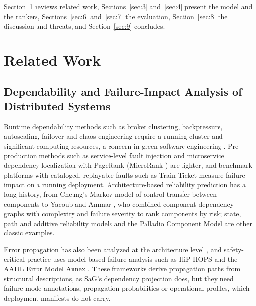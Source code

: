 \documentclass[preprint,3p]{elsarticle}
\begin{document}
Section~\ref{sec:2} reviews related work, Sections~\ref{sec:3} and~\ref{sec:4} present the model and the rankers, Sections~\ref{sec:6} and~\ref{sec:7} the evaluation, Section~\ref{sec:8} the discussion and threats, and Section~\ref{sec:9} concludes.

\section{Related Work}
\label{sec:2}

\subsection{Dependability and Failure-Impact Analysis of Distributed Systems}
\label{sec:2.1}

Runtime dependability methods such as broker clustering, backpressure, autoscaling, failover and chaos engineering \cite{basiri2016chaos} require a running cluster and significant computing resources, a concern in green software engineering \cite{verdecchia2023greenai,schwartz2020greenai}. Pre-production methods such as service-level fault injection \cite{meiklejohn2021service} and microservice dependency localization with PageRank (MicroRank \cite{yu2021microrank}) are lighter, and benchmark platforms with cataloged, replayable faults such as Train-Ticket \cite{zhou2018trainticket} measure failure impact on a running deployment. Architecture-based reliability prediction has a long history, from Cheung's Markov model of control transfer between components \cite{cheung1980user} to Yacoub and Ammar \cite{yacoub2002reliability}, who combined component dependency graphs with complexity and failure severity to rank components by risk; state, path and additive reliability models \cite{gosevapopstojanova2001architecture} and the Palladio Component Model \cite{becker2009palladio} are other classic examples.

Error propagation has also been analyzed at the architecture level \cite{abdelmoez2004error,popic2005error,cortellessa2007modeling,hiller2004epic}, and safety-critical practice uses model-based failure analysis such as HiP-HOPS \cite{papadopoulos1999hiphops} and the AADL Error Model Annex \cite{delange2014aadl}. These frameworks derive propagation paths from structural descriptions, as SaG's dependency projection does, but they need failure-mode annotations, propagation probabilities or operational profiles, which deployment manifests do not carry.
\end{document}
